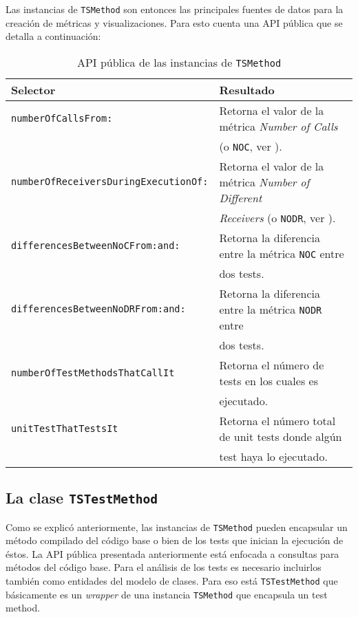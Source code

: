 \par Las instancias de {\tt TSMethod} son entonces las principales fuentes de datos para la creación de métricas y visualizaciones. Para esto cuenta una API pública que se detalla a continuación:  

\begin{table}[h] 
    \centering 
    \begin{tabular}{|l|l|}
    	\hline
\textbf{Selector} & \textbf{Resultado} \\ \hline \hline

{\tt numberOfCallsFrom: } & Retorna el valor de la métrica \emph{Number of Calls}\\
						& (o {\tt NOC}, ver \secref{viz-metricas}). \\ \hline
{\tt numberOfReceiversDuringExecutionOf:} & Retorna el valor de la métrica \emph{Number of Different}  \\ 
						&\emph{Receivers} (o {\tt NODR}, ver \secref{viz-metricas}). \\ \hline
{\tt differencesBetweenNoCFrom:and:}	& Retorna la diferencia entre la métrica {\tt NOC} entre\\
						&  dos tests. \\ \hline
{\tt differencesBetweenNoDRFrom:and:} & Retorna la diferencia entre la métrica {\tt NODR}  entre\\
						&  dos tests. \\ \hline
{\tt numberOfTestMethodsThatCallIt} & Retorna el número de tests en los cuales es  \\ 
						& ejecutado.\\ \hline
{\tt unitTestThatTestsIt} & Retorna el número total de unit tests donde algún  \\ 
						& test haya lo ejecutado. \\ \hline						
    \end{tabular}
    \caption{API pública de las instancias de {\tt TSMethod}}
\end{table} 


\subsection{La clase {\tt TSTestMethod} }
\par Como se explicó anteriormente, las instancias de {\tt TSMethod} pueden encapsular un método compilado del código base o bien de los tests que inician la ejecución de éstos. La API pública presentada anteriormente está enfocada a consultas para métodos del código base. Para el análisis de los tests es necesario incluirlos también como entidades del modelo de clases. Para eso está {\tt TSTestMethod} que básicamente es un \emph{wrapper} de una instancia {\tt TSMethod} que encapsula un test method.

